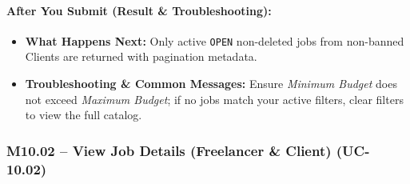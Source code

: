 \paragraph{After You Submit (Result \& Troubleshooting):}
\begin{itemize}[leftmargin=1.5em,itemsep=2pt]
  \item \textbf{What Happens Next:} Only active \texttt{OPEN} non-deleted jobs from non-banned Clients are returned with pagination metadata.
  \item \textbf{Troubleshooting \& Common Messages:} Ensure \textit{Minimum Budget} does not exceed \textit{Maximum Budget}; if no jobs match your active filters, clear filters to view the full catalog.
\end{itemize}

\newpage
\subsubsection[M10.02 -- View Job Details (UC-10.02)]{M10.02 -- View Job Details (Freelancer \& Client) (UC-10.02)}

